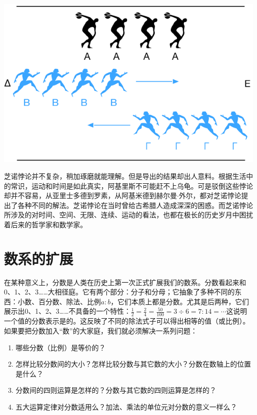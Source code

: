 \documentclass[b5paper]{ctexart}
\begin{document}
\begin{mdframed}
\begin{center}
 \includegraphics[scale=0.3]{img/moving-rows-paradox}
 \label{fig:Moving-rows-paradox}
\end{center}

芝诺悖论并不复杂，稍加琢磨就能理解。但是导出的结果却出人意料。根据生活中的常识，运动和时间是如此真实，阿基里斯不可能赶不上乌龟。可是驳倒这些悖论却并不容易，从亚里士多德到罗素，从阿基米德到赫尔曼$\cdot$外尔，都对芝诺悖论提出了各种不同的解法\cite{Wikipedia-Zeno}。芝诺悖论在当时曾给古希腊人造成深深的困惑。而芝诺悖论所涉及的对时间、空间、无限、连续、运动的看法，也都在极长的历史岁月中困扰着后来的哲学家和数学家。
\end{mdframed}

\section{数系的扩展}
在某种意义上，分数是人类在历史上第一次正式扩展我们的数系。分数看起来和0、1、2、3……大相径庭。它有两个部分：分子和分母；它抽象了多种不同的东西：小数、百分数、除法、比例$a:b$，它们本质上都是分数。尤其是后两种，它们展示出0、1、2、3……不具备的一个特性：$\frac{1}{2} = \frac{2}{4} = \frac{50}{100} = 3 \div 6 = 7:14 = \cdots$这说明一个值的分数表示是的。这反映了不同的除法式子可以得出相等的值（或比例）。如果要把分数加入“数”的大家庭，我们就必须解决一系列问题：

\begin{enumerate}[问题1.]
\item 哪些分数（比例）是等价的？
\item 怎样比较分数间的大小？怎样比较分数与其它数的大小？分数在数轴上的位置是什么？
\item 分数间的四则运算是怎样的？分数与其它数的四则运算是怎样的？
\item 五大运算定律对分数适用么？加法、乘法的单位元对分数的意义一样么？
\end{enumerate}
\end{document}
